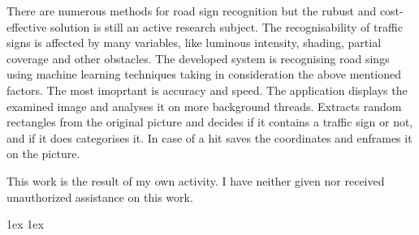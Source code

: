 \documentclass[final]{ubb_dolgozat}
\author{%
Szab\'o \'Agnes-Ter\'ez
}
\begin{document}
\begin{abstractEN} %

\vfill
There are numerous methods for road sign recognition but the rubust and cost-effective solution is still an active research subject. The recognisability of traffic signs is affected by many variables, like luminous intensity, shading, partial coverage and other obstacles. The developed system is recognising road sings using machine learning techniques taking in consideration the above mentioned factors. The most imoprtant is accuracy and speed. The application displays the examined image and analyses it on more background threads. Extracts random rectangles from the original picture and decides if it contains a traffic sign or not, and if it does categorises it. In case of a hit saves the coordinates and enframes it on the picture.

This work is the result of my own activity. I have neither given nor received unauthorized assistance on this work.

\vfill

\end{abstractEN}


\maketitle

{ \baselineskip 1ex
  \parskip 1ex
  \tableofcontents
}

















{


\nocite{*}
}
\end{document}
